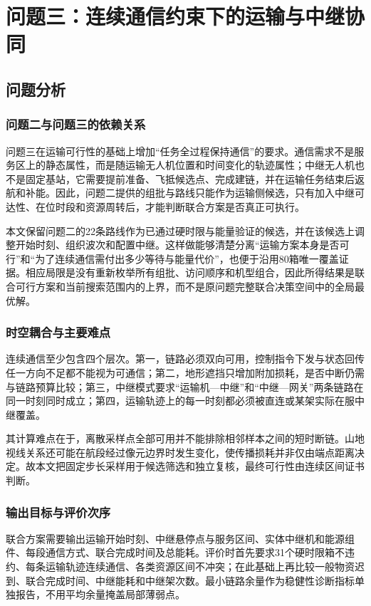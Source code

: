 \section{问题三：连续通信约束下的运输与中继协同}
\subsection{问题分析}
\subsubsection{问题二与问题三的依赖关系}
问题三在运输可行性的基础上增加“任务全过程保持通信”的要求。通信需求不是服务区上的静态属性，而是随运输无人机位置和时间变化的轨迹属性；中继无人机也不是固定基站，它需要提前准备、飞抵候选点、完成建链，并在运输任务结束后返航和补能。因此，问题二提供的组批与路线只能作为运输侧候选，只有加入中继可达性、在位时段和资源周转后，才能判断联合方案是否真正可执行。

本文保留问题二的22条路线作为已通过硬时限与能量验证的候选，并在该候选上调整开始时刻、组织波次和配置中继。这样做能够清楚分离“运输方案本身是否可行”和“为了连续通信需付出多少等待与能量代价”，也便于沿用80箱唯一覆盖证据。相应局限是没有重新枚举所有组批、访问顺序和机型组合，因此所得结果是联合可行方案和当前搜索范围内的上界，而不是原问题完整联合决策空间中的全局最优解。

\subsubsection{时空耦合与主要难点}
连续通信至少包含四个层次。第一，链路必须双向可用，控制指令下发与状态回传任一方向不足都不能视为可通信；第二，地形遮挡只增加附加损耗，是否中断仍需与链路预算比较；第三，中继模式要求“运输机—中继”和“中继—网关”两条链路在同一时刻同时成立；第四，运输轨迹上的每一时刻都必须被直连或某架实际在服中继覆盖。

其计算难点在于，离散采样点全部可用并不能排除相邻样本之间的短时断链。山地视线关系还可能在航段经过像元边界时发生变化，使传播损耗并非仅由端点距离决定。故本文把固定步长采样用于候选筛选和独立复核，最终可行性由连续区间证书判断。

\subsubsection{输出目标与评价次序}
联合方案需要输出运输开始时刻、中继悬停点与服务区间、实体中继机和能源组件、每段通信方式、联合完成时间及总能耗。评价时首先要求31个硬时限箱不违约、每条运输轨迹连续通信、各类资源区间不冲突；在此基础上再比较一般物资迟到、联合完成时间、中继能耗和中继架次数。最小链路余量作为稳健性诊断指标单独报告，不用平均余量掩盖局部薄弱点。

